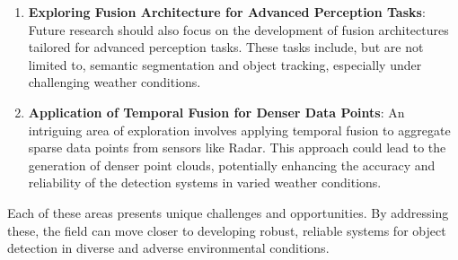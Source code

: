 \documentclass[report.tex]{subfiles}
\begin{document}
\begin{enumerate}
        \item \textbf{Exploring Fusion Architecture for Advanced Perception Tasks}: Future research should also focus on the development of fusion architectures tailored for advanced perception tasks. These tasks include, but are not limited to, semantic segmentation and object tracking, especially under challenging weather conditions.
        
        \item \textbf{Application of Temporal Fusion for Denser Data Points}: An intriguing area of exploration involves applying temporal fusion to aggregate sparse data points from sensors like Radar. This approach could lead to the generation of denser point clouds, potentially enhancing the accuracy and reliability of the detection systems in varied weather conditions.
    \end{enumerate}

    Each of these areas presents unique challenges and opportunities. By addressing these, the field can move closer to developing robust, reliable systems for object detection in diverse and adverse environmental conditions.
\end{document}
